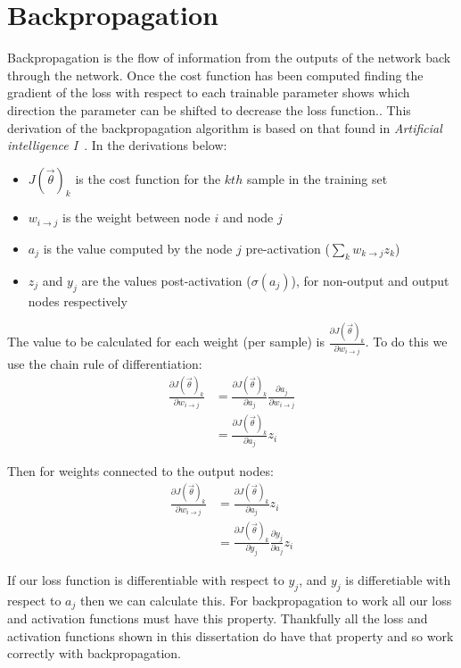 \appendix

\chapter{Backpropagation} \label{backprop}

Backpropagation is the flow of information from the outputs of the network back through the network. Once the cost function has been computed
finding the gradient of the loss with respect to each trainable parameter shows which direction the parameter can be shifted to decrease 
the loss function.. This derivation of the backpropagation algorithm is based on that found in \textit{Artificial intelligence I}~\cite{Art_Int}.
In the derivations below:
\begin{itemize}
  \item $J(\vec{\theta})_k$ is the cost function for the $kth$ sample in the training set
  \item $w_{i \to j}$ is the weight between node $i$ and node $j$
  \item $a_j$ is the value computed by the node $j$ pre-activation ($\sum_{k} w_{k \to j} z_k$)
  \item $z_j$ and $y_j$ are the values post-activation ($\sigma(a_j)$), for non-output and output nodes respectively
\end{itemize}

The value to be calculated for each weight (per sample) is $\frac{\partial J(\vec{\theta})_k}{\partial w_{i \to j}}$. To do this we use the chain rule
of differentiation:
\begin{align}
  \frac{\partial J(\vec{\theta})_k}{\partial w_{i \to j}} & = \frac{\partial J(\vec{\theta})_k}{\partial a_j} \frac{\partial a_j}{\partial w_{i \to j}} \\
  & = \frac{\partial J(\vec{\theta})_k}{\partial a_j} z_i
\end{align}

Then for weights connected to the output nodes:
\begin{align}
  \frac{\partial J(\vec{\theta})_k}{\partial w_{i \to j}} & = \frac{\partial J(\vec{\theta})_k}{\partial a_j} z_i \\
  & = \frac{\partial J(\vec{\theta})_k}{\partial y_j} \frac{\partial y_j}{\partial a_j} z_i
\end{align}

If our loss function is differentiable with respect to $y_j$, and $y_j$ is differetiable with respect to $a_j$ then we can calculate this.  
For backpropagation to work all our loss and activation functions must have this property. Thankfully all the loss and activation functions 
shown in this dissertation do have that property and so work correctly with backpropagation.

